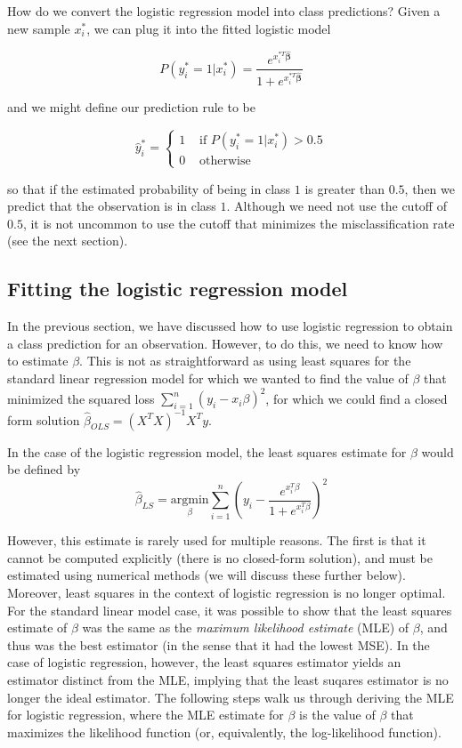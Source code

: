 How do we convert the logistic regression model into class predictions? Given a new sample $x_i^*$, we can plug it into the fitted logistic model

$$P(y_i^* = 1 | x_i^*) = \frac{e^{x_i^{*T} \boldsymbol{\hat{\beta}}} }{1 + e^{x_i^{*T} \boldsymbol{\hat{\beta}}}}$$

and we might define our prediction rule to be

$$\hat{y}_i^* = \begin{cases} 1 & \text{ if $P(y_i^* = 1 | x_i^*) > 0.5$}\\ 0 & \text{ otherwise}\end{cases}$$

so that if the estimated probability of being in class $1$ is greater than $0.5$, then we predict that the observation is in class $1$. Although we need not use the cutoff of $0.5$, it is not uncommon to use the cutoff that minimizes the misclassification rate (see the next section).


\subsection{Fitting the logistic regression model}


In the previous section, we have discussed how to use logistic regression to obtain a class prediction for an observation. However, to do this, we need to know how to estimate $\beta$. This is not as straightforward as using least squares for the standard linear regression model for which we wanted to find the value of $\beta$ that minimized the squared loss $\sum_{i=1}^n (y_i - x_i\beta)^2$, for which we could find a closed form solution $\hat{\beta}_{OLS} = (X^TX)^{-1} X^T y$. 

In the case of the logistic regression model, the least squares estimate for $\beta$ would be defined by 
$$\hat{\beta}_{LS} = \underset{\beta}{\text{argmin}} \sum_{i=1}^n \left(y_i -  \frac{e^{x_i^T \beta}}{1 + e^{x_i^T \beta}}\right)^2$$ 

However, this estimate is rarely used for multiple reasons. The first is that it cannot be computed explicitly (there is no closed-form solution), and must be estimated using numerical methods (we will discuss these further below). Moreover, least squares in the context of logistic regression is no longer optimal. For the standard linear model case, it was possible to show that the least squares estimate of $\beta$ was the same as the \textit{maximum likelihood estimate} (MLE) of $\beta$, and thus was the best estimator (in the sense that it had the lowest MSE). In the case of logistic regression, however, the least squares estimator yields an estimator distinct from the MLE, implying that the least suqares estimator is no longer the ideal estimator. The following steps walk us through deriving the MLE for logistic regression, where the MLE estimate for $\beta$ is the value of $\beta$ that maximizes the likelihood function (or, equivalently, the log-likelihood function).

